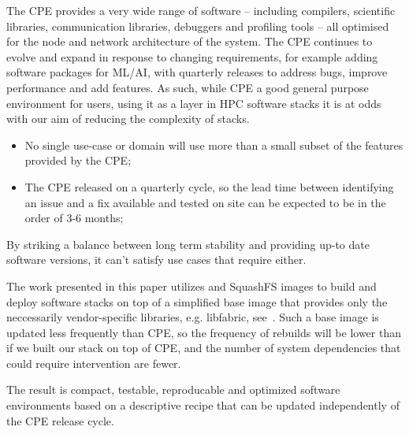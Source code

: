 The CPE provides a very wide range of software -- including compilers, scientific libraries, communication libraries, debuggers and profiling tools -- all optimised for the node and network architecture of the system.
The CPE continues to evolve and expand in response to changing requirements, for example adding software packages for ML/AI, with quarterly releases to address bugs, improve performance and add features.
As such, while CPE a good general purpose environment for users, using it as a layer in HPC software stacks it is at odds with our aim of reducing the complexity of stacks.
\begin{itemize}
    \item No single use-case or domain will use more than a small subset of the features provided by the CPE;
    \item The CPE released on a quarterly cycle, so the lead time between identifying an issue and a fix available and tested on site can be expected to be in the order of 3-6 months;
\end{itemize}
By striking a balance between long term stability and providing up-to date software versions, it can't satisfy use cases that require either.

The work presented in this paper utilizes \spack and SquashFS images to build and deploy software stacks on top of a simplified base image that provides only the neccessarily vendor-specific libraries, e.g. libfabric, see~.
Such a base image is updated less frequently than CPE, so the frequency of rebuilds will be lower than if we built our stack on top of CPE, and the number of system dependencies that could require intervention are fewer.

The result is compact, testable, reproducable and optimized software environments based on a descriptive recipe that can be updated independently of the CPE release cycle.

